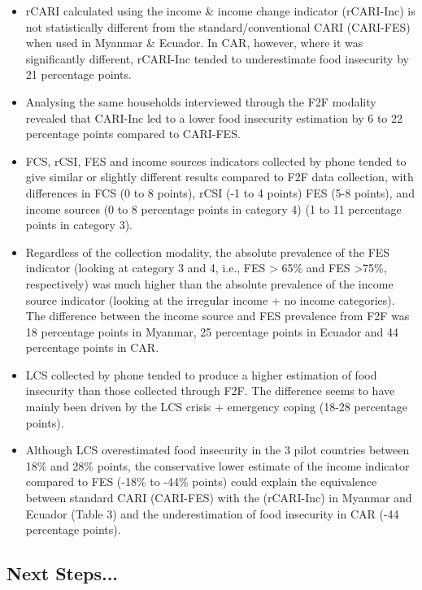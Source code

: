 \documentclass[11pt,harvard]{article}
\begin{document}
	\begin{itemize}[left=1.5em]
		\item rCARI calculated using the income \& income change indicator (rCARI-Inc) is not statistically different from the standard/conventional CARI (CARI-FES) when used in Myanmar \& Ecuador. In CAR, however, where it was significantly different, rCARI-Inc tended to underestimate food insecurity by 21 percentage points. 
		
		\item Analysing the same households interviewed through the F2F modality revealed that CARI-Inc led to a lower food insecurity estimation by 6 to 22 percentage points compared to CARI-FES.
		
		\item FCS, rCSI, FES and income sources indicators collected by phone tended to give similar or slightly different results compared to F2F data collection, with differences in FCS (0 to 8 points), rCSI (-1 to 4 points) FES (5-8 points), and income sources (0 to 8 percentage points in category 4) (1 to 11 percentage points in category 3).
		
		\item Regardless of the collection modality, the absolute prevalence of the FES indicator (looking at category 3 and 4, i.e., FES > 65\% and FES >75\%, respectively) was much higher than the absolute prevalence of the income source indicator (looking at the irregular income + no income categories). The difference between the income source and FES prevalence from F2F was 18 percentage points in Myanmar, 25 percentage points in Ecuador and 44 percentage points in CAR.
		
		\item LCS collected by phone tended to produce a higher estimation of food insecurity than those collected through F2F. The difference seems to have mainly been driven by the LCS crisis + emergency coping (18-28 percentage points).
		
		\item Although LCS overestimated food insecurity in the 3 pilot countries between 18\% and 28\% points, the conservative lower estimate of the income indicator compared to FES (-18\% to
		-44\% points) could explain the equivalence between standard CARI (CARI-FES) with the (rCARI-Inc) in Myanmar and Ecuador (Table 3) and the underestimation of food insecurity in CAR (-44 percentage points).
	\end{itemize}
	

\subsection{Next Steps...}
\end{document}
